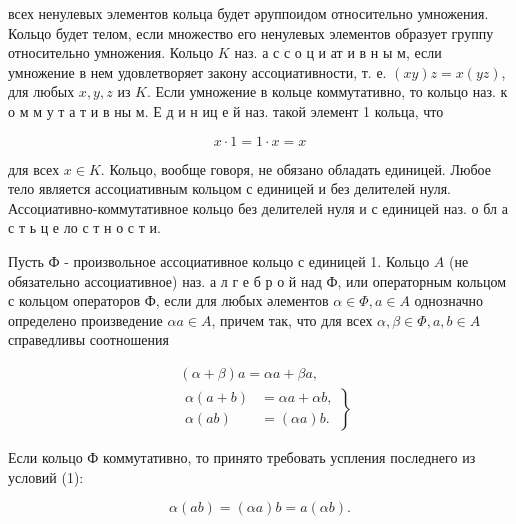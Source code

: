 \documentclass[10pt]{article}
\begin{document}
всех ненулевых элементов кольца будет әруппоидом относительно умножения. Кольцо будет телом, если множество его ненулевых элементов образует группу относительно умножения. Кольцо $K$ наз. а с с о ц и ат и в н ы м, если умножение в нем удовлетворяет закону ассоциативности, т. е. $(x y) z=x(y z)$, для любых $x, y, z$ из $K$. Если умножение в кольце коммутативно, то кольцо наз. к о м м у т а т и в ны м. Е д и н иц е й наз. такой элемент 1 кольца, что



\[

x \cdot 1=1 \cdot x=x

\]



для всех $x \in K$. Кольцо, вообще говоря, не обязано обладать единицей. Любое тело является ассоциативным кольцом с единицей и без делителей нуля. Ассоциативно-коммутативное кольцо без делителей нуля и с единицей наз. о бл а с т ь ц е ло с т н о с т и.



Пусть Ф - произвольное ассоциативное кольцо с единицей 1. Кольцо $A$ (не обязательно ассоциативное) наз. а л г е б р о й над Ф, или операторным кольцом с кольцом операторов Ф, если для любых әлементов $\alpha \in \Phi, a \in A$ однозначно определено произведение $\alpha a \in A$, причем так, что для всех $\alpha, \beta \in \Phi, a, b \in A$ справедливы соотношения



\[

\begin{aligned}

& (\alpha+\beta) a=\alpha a+\beta a, \\

& \left.\begin{array}{rl}

\alpha(a+b) & =\alpha a+\alpha b, \\

\alpha(a b) & =(\alpha a) b .

\end{array}\right\}

\end{aligned}

\]



Если кольцо Ф коммутативно, то принято требовать успления последнего из условий (1):



\[

\alpha(a b)=(\alpha a) b=a(\alpha b) .

\]
\end{document}
